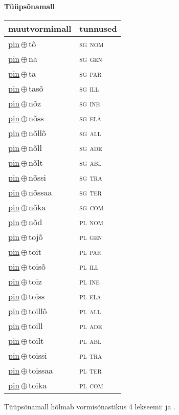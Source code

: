 

\vspace{3.5em}
\noindent \begin{minipage}{\textwidth}
\noindent \textbf{Tüüpsõnamall \,}\\

\begin{sideways}
\begin{tabular}{l l}
muutvormimall & tunnused \\
\hline
\underline{pin}\,$\oplus$\,tõ & \textsc{ sg nom } \\
\underline{pin}\,$\oplus$\,na & \textsc{ sg gen } \\
\underline{pin}\,$\oplus$\,ta & \textsc{ sg par } \\
\underline{pin}\,$\oplus$\,tasõ & \textsc{ sg ill } \\
\underline{pin}\,$\oplus$\,nõz & \textsc{ sg ine } \\
\underline{pin}\,$\oplus$\,nõss & \textsc{ sg ela } \\
\underline{pin}\,$\oplus$\,nõllõ & \textsc{ sg all } \\
\underline{pin}\,$\oplus$\,nõll & \textsc{ sg ade } \\
\underline{pin}\,$\oplus$\,nõlt & \textsc{ sg abl } \\
\underline{pin}\,$\oplus$\,nõssi & \textsc{ sg tra } \\
\underline{pin}\,$\oplus$\,nõssaa & \textsc{ sg ter } \\
\underline{pin}\,$\oplus$\,nõka & \textsc{ sg com } \\
\underline{pin}\,$\oplus$\,nõd & \textsc{ pl nom } \\
\underline{pin}\,$\oplus$\,tojõ & \textsc{ pl gen } \\
\underline{pin}\,$\oplus$\,toit & \textsc{ pl par } \\
\underline{pin}\,$\oplus$\,toisõ & \textsc{ pl ill } \\
\underline{pin}\,$\oplus$\,toiz & \textsc{ pl ine } \\
\underline{pin}\,$\oplus$\,toiss & \textsc{ pl ela } \\
\underline{pin}\,$\oplus$\,toillõ & \textsc{ pl all } \\
\underline{pin}\,$\oplus$\,toill & \textsc{ pl ade } \\
\underline{pin}\,$\oplus$\,toilt & \textsc{ pl abl } \\
\underline{pin}\,$\oplus$\,toissi & \textsc{ pl tra } \\
\underline{pin}\,$\oplus$\,toissaa & \textsc{ pl ter } \\
\underline{pin}\,$\oplus$\,toika & \textsc{ pl com } \\
\end{tabular}
\end{sideways}
\label{tab:tüüpsõnamall-pintõ}

\end{minipage}

 
\vspace{1em}
\noindent Tüüpsõnamall  hõlmab vormisõnastikus 4 lekseemi:  ja .
